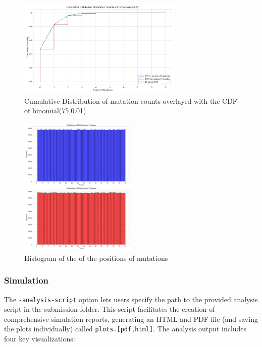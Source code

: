 \documentclass{article}
\begin{document}
    \begin{figure}
        \centering
        \includegraphics[width=0.7\textwidth]{figures/readsimulator/cumulative_distribution_mutation_counts_FWRW}
        \caption{Cumulative Distribution of mutation counts overlayed with the CDF of binomial(75,0.01)}
        \label{fig:cumulative-distribution-mutation-counts}
    \end{figure}

    \begin{figure}
        \centering
        \includegraphics[width=0.5\textwidth]{figures/readsimulator/histogram_mutation_positions}
        \caption{Histogram of the of the positions of mutations}
        \label{fig:histogram_mutation_positions}
    \end{figure}

    \subsubsection{Simulation}

    The \texttt{-analysis-script} option lets users specify the path to the provided analysis script in the submission folder. This script facilitates the creation of comprehensive simulation reports, generating an HTML and PDF file (and saving the plots individually) called \texttt{plots.[pdf,html]}. The analysis output includes four key visualizations:
\end{document}
